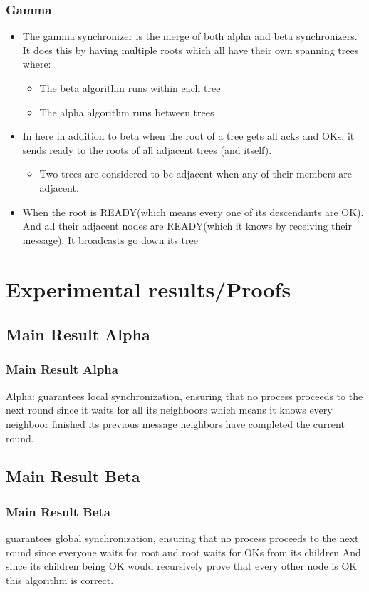 \documentclass[11pt]{beamer}              %
\begin{document}
\begin{frame}
	\frametitle{Gamma}
	\begin{itemize}
		\item The gamma synchronizer is the merge of both alpha and beta synchronizers. It does this by having multiple roots which all have their own spanning trees where:
		\begin{itemize}
			\item The beta algorithm runs within each tree 
			\item The alpha algorithm runs between trees
		\end{itemize}
		\item In here in addition to beta when the root of a tree gets all acks and OKs, it sends ready to the roots of all adjacent trees (and itself).
		\begin{itemize}
			\item Two trees are considered to be adjacent when any of their members are adjacent.
		\end{itemize}
		\item When the root is READY(which means every one of its descendants are OK). And all their adjacent nodes are READY(which it knows by receiving their message). It broadcasts go down its tree
		
	\end{itemize}
\end{frame}


\section{Experimental results/Proofs}

\subsection{Main Result Alpha}
\begin{frame}
	\frametitle{Main Result Alpha}
	Alpha: guarantees local synchronization, ensuring that no process proceeds to the next round since it waits for all its neighboors which means it knows every neighboor finished its previous message neighbors have completed the current round.
\end{frame}

\subsection{Main Result Beta}
\begin{frame}
	\frametitle{Main Result Beta}
	guarantees global synchronization, ensuring that no process proceeds to the next round since everyone waits for root and root waits for OKs from its children And since its children being OK would recursively prove that every other node is OK this algorithm is correct.
\end{frame}
\end{document}
